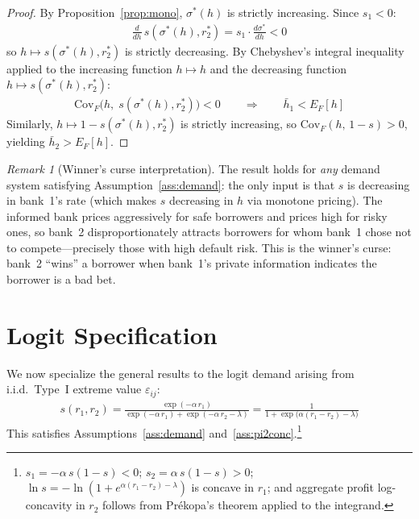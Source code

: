 \documentclass[12pt]{article}
\theoremstyle{plain}
\theoremstyle{plain}
\theoremstyle{definition}  %
\theoremstyle{remark}  %
\newtheorem{remark}[thm]{Remark}  %
\begin{document}
\begin{proof}
By Proposition~\ref{prop:mono}, $\sigma^*(h)$ is strictly increasing. Since $s_1 < 0$:
\begin{align*}
    \frac{d}{dh}\,s(\sigma^*(h), r_2^*) = s_1 \cdot \frac{d\sigma^*}{dh} < 0
\end{align*}
so $h \mapsto s(\sigma^*(h), r_2^*)$ is strictly decreasing. By Chebyshev's integral inequality applied to the increasing function $h \mapsto h$ and the decreasing function $h \mapsto s(\sigma^*(h), r_2^*)$:
\begin{align*}
    \text{Cov}_F\!\big(h,\; s(\sigma^*(h), r_2^*)\big) < 0 \qquad\Longrightarrow\qquad \bar{h}_1 < E_F[h]
\end{align*}
Similarly, $h \mapsto 1-s(\sigma^*(h), r_2^*)$ is strictly increasing, so $\text{Cov}_F(h,\, 1-s) > 0$, yielding $\bar{h}_2 > E_F[h]$.
\end{proof}

\begin{remark}[Winner's curse interpretation]\label{rem:winners_curse}
The result holds for \emph{any} demand system satisfying Assumption~\ref{ass:demand}: the only input is that $s$ is decreasing in bank~1's rate (which makes $s$ decreasing in $h$ via monotone pricing). The informed bank prices aggressively for safe borrowers and prices high for risky ones, so bank~2 disproportionately attracts borrowers for whom bank~1 chose not to compete---precisely those with high default risk. This is the winner's curse: bank~2 ``wins'' a borrower when bank~1's private information indicates the borrower is a bad bet.
\end{remark}



\section{Logit Specification}\label{sec:logit}

We now specialize the general results to the logit demand arising from i.i.d.\ Type~I extreme value $\varepsilon_{ij}$:
\begin{align}\label{eq:logit_share}
    s(r_1, r_2) = \frac{\exp(-\alpha\, r_1)}{\exp(-\alpha\, r_1) + \exp(-\alpha\, r_2 - \lambda)} = \frac{1}{1 + \exp\!\big(\alpha(r_1 - r_2) - \lambda\big)}
\end{align}
This satisfies Assumptions~\ref{ass:demand} and~\ref{ass:pi2conc}.\footnote{$s_1 = -\alpha\,s(1-s) < 0$; $s_2 = \alpha\,s(1-s) > 0$; $\ln s = -\ln(1+e^{\alpha(r_1-r_2)-\lambda})$ is concave in $r_1$; and aggregate profit log-concavity in $r_2$ follows from Pr\'ekopa's theorem applied to the integrand.}
\end{document}

